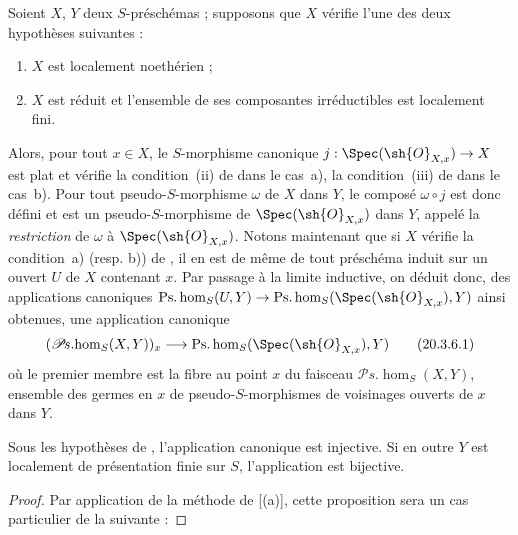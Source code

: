 \begin{env}[20.3.6]
\label{IV.20.3.6}
Soient $X$, $Y$ deux $S$-préschémas ; supposons que $X$ vérifie l'une des deux hypothèses suivantes :
\begin{enumerate}[label=\emph{\alph*)}]
  \item $X$ est localement noethérien ;
  \item $X$ est réduit et l'ensemble de ses composantes irréductibles est localement fini.
\end{enumerate}
Alors, pour tout $x\in X$, le $S$-morphisme canonique $j:\Spec(\sh{O}_{X,x})\to X$ est plat et vérifie la condition~(ii) de  dans le cas~a), la condition~(iii) de  dans le cas~b).
Pour tout pseudo-$S$-morphisme $\omega$ de $X$ dans $Y$, le composé $\omega\circ j$ est donc défini et est un pseudo-$S$-morphisme de $\Spec(\sh{O}_{X,x})$ dans $Y$, appelé la \emph{restriction} de $\omega$ à $\Spec(\sh{O}_{X,x})$.
Notons maintenant que si $X$ vérifie la condition~a) (resp. b)) de , il en est de même de tout préschéma induit sur un ouvert $U$ de $X$ contenant $x$.
Par passage à la limite inductive, on déduit donc, des applications canoniques $\operatorname{Ps.hom}_S(U,Y)\to\operatorname{Ps.hom}_S(\Spec(\sh{O}_{X,x}),Y)$ ainsi obtenues, une application canonique
\[
\label{IV.20.3.6.1}
  (\mathscr{P}\!s.\!\operatorname{hom}_S(X,Y))_x\to\operatorname{Ps.hom}_S(\Spec(\sh{O}_{X,x}),Y)
  \tag{20.3.6.1}
\]
où le premier membre est la fibre au point $x$ du faisceau $\mathscr{P}\!s.\!\operatorname{hom}_S(X,Y)$, ensemble des germes en $x$ de pseudo-$S$-morphismes de voisinages ouverts de $x$ dans $Y$.
\end{env}

\begin{proposition}[20.3.7]
\label{IV.20.3.7}
Sous les hypothèses de , l'application canonique  est injective.
Si en outre $Y$ est localement de présentation finie sur $S$, l'application  est bijective.
\end{proposition}

\begin{proof}
Par application de la méthode de [(a)], cette proposition sera un cas particulier de la suivante :
\end{proof}

